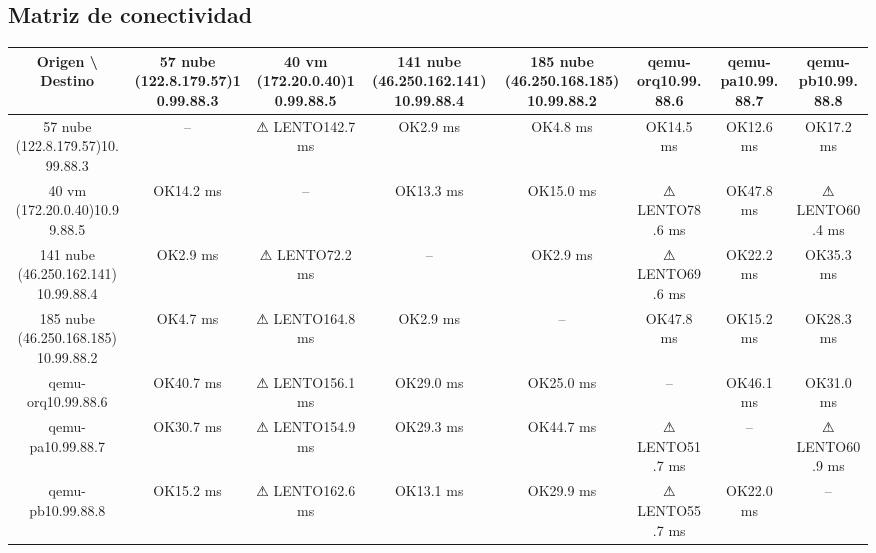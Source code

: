\documentclass[11pt,a4paper]{article}
\begin{document}
\subsection{Matriz de conectividad}
\begin{longtable}{|c|c|c|c|c|c|c|c|}
\hline
Origen \textbackslash{} Destino & 57 nube (122.8.179.57)10.99.88.3 & 40 vm (172.20.0.40)10.99.88.5 & 141 nube (46.250.162.141)10.99.88.4 & 185 nube (46.250.168.185)10.99.88.2 & qemu-orq10.99.88.6 & qemu-pa10.99.88.7 & qemu-pb10.99.88.8 \\ \hline
57 nube (122.8.179.57)10.99.88.3 & -- & ⚠ LENTO142.7 ms & OK2.9 ms & OK4.8 ms & OK14.5 ms & OK12.6 ms & OK17.2 ms \\ \hline
40 vm (172.20.0.40)10.99.88.5 & OK14.2 ms & -- & OK13.3 ms & OK15.0 ms & ⚠ LENTO78.6 ms & OK47.8 ms & ⚠ LENTO60.4 ms \\ \hline
141 nube (46.250.162.141)10.99.88.4 & OK2.9 ms & ⚠ LENTO72.2 ms & -- & OK2.9 ms & ⚠ LENTO69.6 ms & OK22.2 ms & OK35.3 ms \\ \hline
185 nube (46.250.168.185)10.99.88.2 & OK4.7 ms & ⚠ LENTO164.8 ms & OK2.9 ms & -- & OK47.8 ms & OK15.2 ms & OK28.3 ms \\ \hline
qemu-orq10.99.88.6 & OK40.7 ms & ⚠ LENTO156.1 ms & OK29.0 ms & OK25.0 ms & -- & OK46.1 ms & OK31.0 ms \\ \hline
qemu-pa10.99.88.7 & OK30.7 ms & ⚠ LENTO154.9 ms & OK29.3 ms & OK44.7 ms & ⚠ LENTO51.7 ms & -- & ⚠ LENTO60.9 ms \\ \hline
qemu-pb10.99.88.8 & OK15.2 ms & ⚠ LENTO162.6 ms & OK13.1 ms & OK29.9 ms & ⚠ LENTO55.7 ms & OK22.0 ms & -- \\ \hline
\end{longtable}
\end{document}
